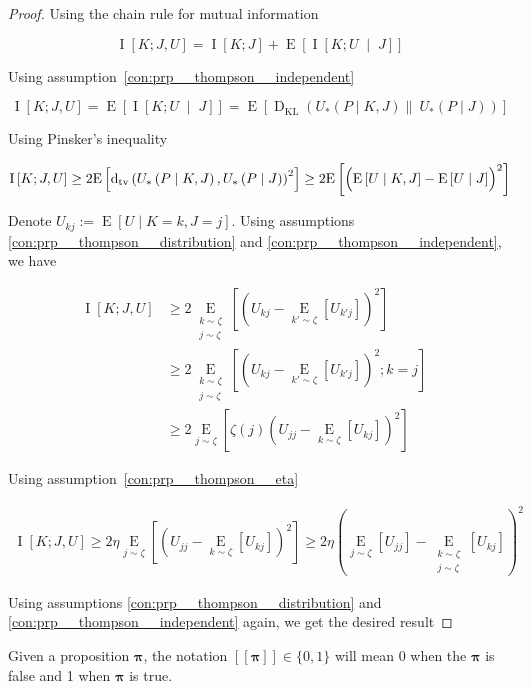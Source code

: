 \documentclass[anon,12pt]{colt2018} %
\newcommand{\AP}[1]{\left(#1\right)}
\newcommand{\AB}[1]{\left[#1\right]}
\newcommand{\ABM}[2]{\left[#1\;\middle\vert\;#2\right]}
\newcommand{\Ea}[2]{\underset{#1}{\operatorname{E}}\AB{#2}}
\newcommand{\CI}[3]{\underset{#1}{\operatorname{I}}\ABM{#2}{#3}}
\newcommand{\Ia}[2]{\underset{#1}{\operatorname{I}}\AB{#2}}
\newcommand{\KL}[2]{\operatorname{D}_{\mathrm{KL}}(#1 \| #2)}
\newcommand{\Dtva}[1]{\operatorname{d}_{\textnormal{tv}}\AP{#1}}
\begin{document}
\begin{proof}

Using the chain rule for mutual information

\[\Ia{}{K;J,U} = \Ia{}{K;J} + \Ea{}{\CI{}{K;U}{J}}\]

Using assumption~\ref{con:prp__thompson__independent}

\[\Ia{}{K;J,U} = \Ea{}{\CI{}{K;U}{J}}
= \Ea{}{\KL{U_*\left(P \mid K,J\right)}{\ U_*\left(P \mid J\right)}}\]

Using Pinsker's inequality

$$\Ia{}{K;J,U} \geq 2\Ea{}{\Dtva{U_*\left(P \mid K,J\right),U_*\left(P \mid J\right)}^2} \geq 2\Ea{}{\AP{\Ea{}{U \mid K,J}-\Ea{}{U \mid J}}^2}$$

Denote $U_{kj} := \Ea{}{U \mid K = k, J = j}$. Using assumptions \ref{con:prp__thompson__distribution} and \ref{con:prp__thompson__independent}, we have

\begin{align*}
\Ia{}{K;J,U} &\geq 2\Ea{\substack{k\sim\zeta\\j\sim\zeta}}{\AP{U_{kj}-\Ea{k'\sim\zeta}{U_{k'j}}}^2}\\
&\geq 2\Ea{\substack{k\sim\zeta\\j\sim\zeta}}{\AP{U_{kj}-\Ea{k'\sim\zeta}{U_{k'j}}}^2;k=j}\\
&\geq 2\Ea{j \sim \zeta}{\zeta(j)\AP{U_{jj}-\Ea{k\sim\zeta}{U_{kj}}}^2}
&\end{align*}

Using assumption~\ref{con:prp__thompson__eta}

\begin{align*}
\Ia{}{K;J,U} \geq 2\eta\Ea{j \sim \zeta}{\AP{U_{jj}-\Ea{k\sim\zeta}{U_{kj}}}^2}\geq 2\eta \AP{\Ea{j \sim \zeta}{U_{jj}}-\Ea{\substack{k\sim\zeta\\j\sim\zeta}}{U_{kj}}}^2
\end{align*}

Using assumptions \ref{con:prp__thompson__distribution} and \ref{con:prp__thompson__independent} again, we get the desired result
\end{proof}

Given a proposition $\boldsymbol{\pi}$, the notation $[[\boldsymbol{\pi}]] \in \{0,1\}$ will mean 0 when the $\boldsymbol{\pi}$ is false and 1 when $\boldsymbol{\pi}$ is true.
\end{document}
